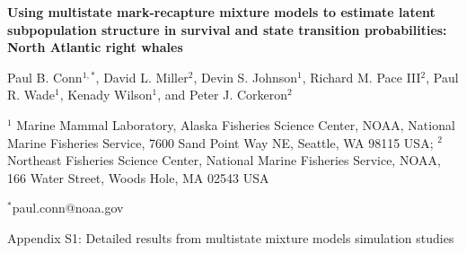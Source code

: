 \documentclass[times,mee,doublespace,]{besauth2}
\begin{document}
\begin{center} \bf {\large Using multistate mark-recapture mixture models to estimate latent subpopulation structure in survival and state transition probabilities: North Atlantic right whales}

\rm

\vspace{0.7cm}
Paul B. Conn$^{1,*}$, David L. Miller$^2$, Devin S. Johnson$^1$, Richard M. Pace III$^2$, Paul R. Wade$^1$, Kenady Wilson$^1$, and Peter J. Corkeron$^2$
\end{center}
\vspace{0.5cm}

\rm
\small


$^1$ Marine Mammal Laboratory, Alaska Fisheries Science Center, NOAA, National Marine Fisheries Service, 7600 Sand Point Way NE, Seattle, WA 98115 USA; $^2$ Northeast Fisheries Science Center, National Marine Fisheries Service,
NOAA, 166 Water Street, Woods Hole, MA 02543 USA

$^*$paul.conn@noaa.gov

\large
\bigskip
\centerline{Appendix S1: Detailed results from multistate mixture models simulation studies}
\bigskip
\small

\linenumbers

\def\VAR{{\rm Var}\,}
\def\COV{{\rm Cov}\,}
\def\Prob{{\rm P}\,}
\end{document}
